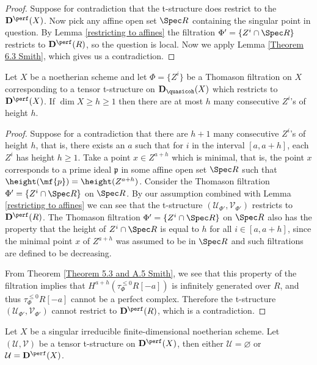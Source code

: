 \begin{proof}
    Suppose for contradiction that the t-structure does restrict to the $\mathbf{D}^{\perf}(X)$. Now pick any affine open set $\Spec R$ containing the singular point in question. By Lemma \ref{restricting to affines} the filtration $\Phi'=\{Z^i \cap \Spec R\}$ restricts to $\mathbf{D}^{\perf}(R)$, so the question is local. Now we apply Lemma \ref{Theorem 6.3 Smith}, which gives us a contradiction.
\end{proof}

\begin{Lemma}\label{height}
    Let $X$ be a noetherian scheme and let $\Phi=\{Z^i\}$ be a Thomason filtration on $X$ corresponding to a tensor t-structure on $\mathbf{D}_{\quasicoh}(X)$ which restricts to $\mathbf{D}^{\perf}(X)$. If $\dim X \geq h\geq 1$ then there are at most $h$ many consecutive $Z^i$'s of height $h$.
\end{Lemma}

\begin{proof}
    Suppose for a contradiction that there are $h+1$ many consecutive $Z^i$'s of height $h$, that is, there exists an $a$ such that for $i$ in the interval $[a, a+h]$, each $Z^i$ has height $h\geq 1$. Take a point $x\in Z^{a+h}$ which is minimal, that is, the point $x$ corresponds to a prime ideal $\mathfrak{p}$ in some affine open set $\Spec R$ such that $\height(\mf{p})=\height(Z^{a+h})$.  Consider the Thomason filtration $\Phi'=\{Z^i \cap \Spec R\}$ on $\Spec R$. By our assumption combined with Lemma \ref{restricting to affines} we can see that the t-structure $(\mathcal{U}_{\Phi'}, \mathcal{V}_{\Phi'})$ restricts to $\mathbf{D}^{\perf}(R)$. The Thomason filtration $\Phi'=\{Z^i \cap \Spec R\}$ on $\Spec R$ also has the property that the height of $Z^i 
    \cap \Spec R$ is equal to $h$ for all $i\in[a, a+h]$, since the minimal point $x$ of $Z^{a+h}$ was assumed to be in $\Spec R$ and such filtrations are defined to be decreasing.
    
    From Theorem \ref{Theorem 5.3 and A.5 Smith}, we see that this property of the filtration implies that $H^{a+h}(\tau_\Phi^{\leq 0}R[-a])$ is infinitely generated over $R$, and thus $\tau_\Phi^{\leq 0}R[-a]$ cannot be a perfect complex. Therefore the t-structure $(\mathcal{U}_{\Phi'}, \mathcal{V}_{\Phi'})$ cannot restrict to $\mathbf{D}^{\perf}(R)$, which is a contradiction.
\end{proof}


\begin{Th}\label{main}
    Let $X$ be a singular irreducible finite-dimensional noetherian scheme. Let $(\mathcal{U}, \mathcal{V})$ be a tensor t-structure on $\mathbf{D}^{\perf}(X)$, then either $\mathcal{U}=\varnothing$ or  $\mathcal{U}=\mathbf{D}^{\perf}(X)$.
\end{Th}

